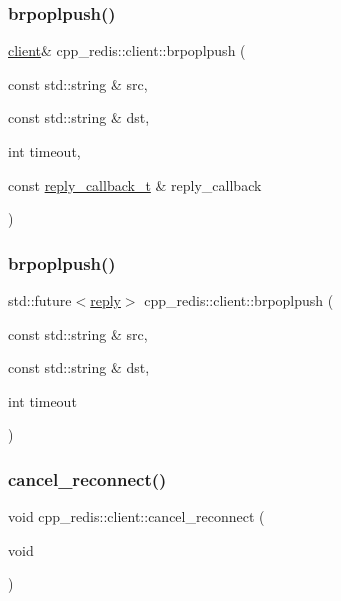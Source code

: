 \subsubsection{\texorpdfstring{brpoplpush()}{brpoplpush()}\hspace{0.1cm}{\footnotesize\ttfamily [1/2]}}
{\footnotesize\ttfamily \hyperlink{classcpp__redis_1_1client}{client}\& cpp\+\_\+redis\+::client\+::brpoplpush (\begin{DoxyParamCaption}\item[{const std\+::string \&}]{src,  }\item[{const std\+::string \&}]{dst,  }\item[{int}]{timeout,  }\item[{const \hyperlink{classcpp__redis_1_1client_a061a1140d36d2eaeda82b09a0bb3f9f2}{reply\+\_\+callback\+\_\+t} \&}]{reply\+\_\+callback }\end{DoxyParamCaption})}

\mbox{\label{classcpp__redis_1_1client_aa30b9303ee0d59b07dd656db2426547e}} 
\subsubsection{\texorpdfstring{brpoplpush()}{brpoplpush()}\hspace{0.1cm}{\footnotesize\ttfamily [2/2]}}
{\footnotesize\ttfamily std\+::future$<$\hyperlink{classcpp__redis_1_1reply}{reply}$>$ cpp\+\_\+redis\+::client\+::brpoplpush (\begin{DoxyParamCaption}\item[{const std\+::string \&}]{src,  }\item[{const std\+::string \&}]{dst,  }\item[{int}]{timeout }\end{DoxyParamCaption})}

\mbox{\label{classcpp__redis_1_1client_adb605a877f65b8f54725576b45aeeca6}} 
\subsubsection{\texorpdfstring{cancel\+\_\+reconnect()}{cancel\_reconnect()}}
{\footnotesize\ttfamily void cpp\+\_\+redis\+::client\+::cancel\+\_\+reconnect (\begin{DoxyParamCaption}\item[{void}]{ }\end{DoxyParamCaption})}


